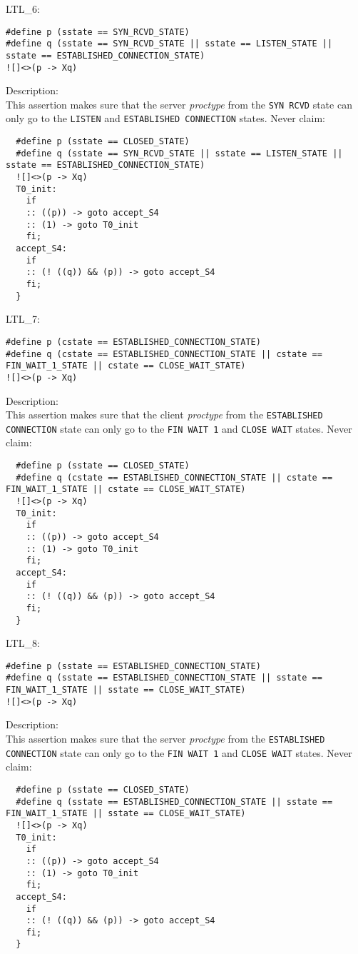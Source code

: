 \documentclass{WigReport}
\begin{document}
LTL\_6:\\
\begin{lstlisting}
#define p (sstate == SYN_RCVD_STATE)
#define q (sstate == SYN_RCVD_STATE || sstate == LISTEN_STATE || sstate == ESTABLISHED_CONNECTION_STATE)
![]<>(p -> Xq)
\end{lstlisting}
Description:\\
This assertion makes sure that the server \textit{proctype} from the \verb|SYN RCVD| state can only go to the \verb|LISTEN| and \verb|ESTABLISHED CONNECTION| states.
Never claim:\\
\begin{lstlisting}
  #define p (sstate == CLOSED_STATE)
  #define q (sstate == SYN_RCVD_STATE || sstate == LISTEN_STATE || sstate == ESTABLISHED_CONNECTION_STATE)
  ![]<>(p -> Xq)
  T0_init:
    if
    :: ((p)) -> goto accept_S4
    :: (1) -> goto T0_init
    fi;
  accept_S4:
    if
    :: (! ((q)) && (p)) -> goto accept_S4
    fi;
  }
\end{lstlisting}


LTL\_7:\\
\begin{lstlisting}
#define p (cstate == ESTABLISHED_CONNECTION_STATE)
#define q (cstate == ESTABLISHED_CONNECTION_STATE || cstate == FIN_WAIT_1_STATE || cstate == CLOSE_WAIT_STATE)
![]<>(p -> Xq)
\end{lstlisting}
Description:\\
This assertion makes sure that the client \textit{proctype} from the \verb|ESTABLISHED CONNECTION| state can only go to the \verb|FIN WAIT 1| and \verb|CLOSE WAIT| states.
Never claim:\\
\begin{lstlisting}
  #define p (sstate == CLOSED_STATE)
  #define q (cstate == ESTABLISHED_CONNECTION_STATE || cstate == FIN_WAIT_1_STATE || cstate == CLOSE_WAIT_STATE)
  ![]<>(p -> Xq)
  T0_init:
    if
    :: ((p)) -> goto accept_S4
    :: (1) -> goto T0_init
    fi;
  accept_S4:
    if
    :: (! ((q)) && (p)) -> goto accept_S4
    fi;
  }
\end{lstlisting}


LTL\_8:\\
\begin{lstlisting}
#define p (sstate == ESTABLISHED_CONNECTION_STATE)
#define q (sstate == ESTABLISHED_CONNECTION_STATE || sstate == FIN_WAIT_1_STATE || sstate == CLOSE_WAIT_STATE)
![]<>(p -> Xq)
\end{lstlisting}
Description:\\
This assertion makes sure that the server \textit{proctype} from the \verb|ESTABLISHED CONNECTION| state can only go to the \verb|FIN WAIT 1| and \verb|CLOSE WAIT| states.
Never claim:\\
\begin{lstlisting}
  #define p (sstate == CLOSED_STATE)
  #define q (sstate == ESTABLISHED_CONNECTION_STATE || sstate == FIN_WAIT_1_STATE || sstate == CLOSE_WAIT_STATE)
  ![]<>(p -> Xq)
  T0_init:
    if
    :: ((p)) -> goto accept_S4
    :: (1) -> goto T0_init
    fi;
  accept_S4:
    if
    :: (! ((q)) && (p)) -> goto accept_S4
    fi;
  }
\end{lstlisting}
\end{document}
